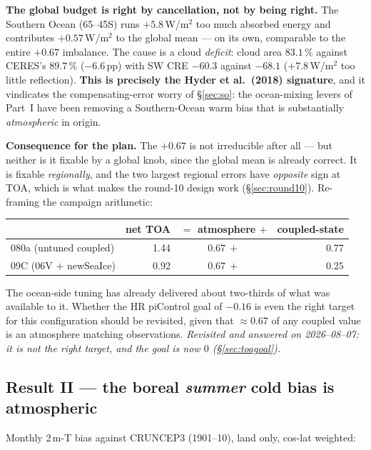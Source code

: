 \documentclass[10pt]{article}
\begin{document}
\textbf{The global budget is right by cancellation, not by being right.} The Southern Ocean
(65--45\textdegree S) runs $+5.8$\,W/m$^2$ too much absorbed energy and contributes
$\mathbf{+0.57}$\,W/m$^2$ to the global mean --- on its own, comparable to the entire $+0.67$ imbalance. The
cause is a cloud \emph{deficit}: cloud area $83.1\,\%$ against CERES's $89.7\,\%$ ($-6.6$\,pp) with SW CRE
$-60.3$ against $-68.1$ ($+7.8$\,W/m$^2$ too little reflection). \textbf{This is precisely the Hyder et al.\
(2018) signature}, and it vindicates the compensating-error worry of \S\ref{sec:so}: the ocean-mixing levers
of Part~I have been removing a Southern-Ocean warm bias that is substantially \emph{atmospheric} in origin.

\textbf{Consequence for the plan.} The $+0.67$ is not irreducible after all --- but neither is it fixable by a
global knob, since the global mean is already correct. It is fixable \emph{regionally}, and the two largest
regional errors have \emph{opposite} sign at TOA, which is what makes the round-10 design work
(\S\ref{sec:round10}). Re-framing the campaign arithmetic:
\begin{center}\small
\begin{tabular}{l r c r}
\toprule
 & net TOA & $=$ atmosphere $+$ & coupled-state \\
\midrule
080a (untuned coupled) & 1.44 & $0.67\ +$ & $\mathbf{0.77}$ \\
09C (06V $+$ newSeaIce) & 0.92 & $0.67\ +$ & $\mathbf{0.25}$ \\
\bottomrule
\end{tabular}
\end{center}
The ocean-side tuning has already delivered about two-thirds of what was available to it. Whether the HR
piControl goal of $-0.16$ is even the right target for this configuration should be revisited, given that
$\approx0.67$ of any coupled value is an atmosphere matching observations.
\emph{Revisited and answered on 2026--08--07: it is not the right target, and the goal is now $0$
(\S\ref{sec:toagoal}).}

\subsection{Result II --- the boreal \emph{summer} cold bias is atmospheric}\label{sub:amipsummer}
Monthly 2\,m-T bias against CRUNCEP3 (1901--10), land only, cos-lat weighted:
\end{document}
